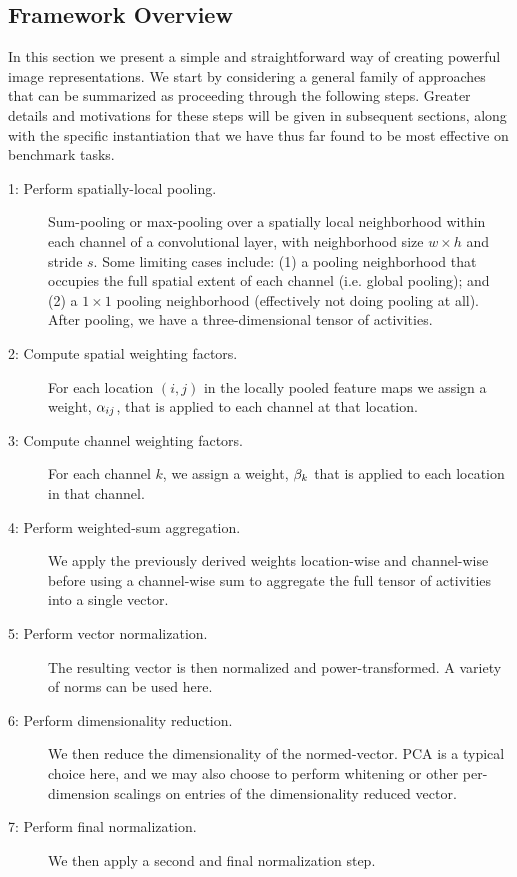 \documentclass[runningheads]{llncs}
\begin{document}
\subsection{Framework Overview}

In this section we present a simple and straightforward way of creating powerful image representations.
We start by considering a general family of approaches that can be summarized as proceeding through the following steps. Greater details and motivations for these steps will be given in subsequent sections, along with the specific instantiation that we have thus far found to be most effective on benchmark tasks. 






\begin{description}
  \item[1: Perform spatially-local pooling.]
	Sum-pooling or max-pooling over a spatially local neighborhood within each channel of a convolutional layer, with neighborhood size $w{\times}h$ and stride $s$. Some limiting cases include: (1) a pooling neighborhood that occupies the full spatial extent of each channel (i.e. global pooling); and (2) a $1{\times}1$ pooling neighborhood (effectively not doing pooling at all). After pooling, we have a three-dimensional tensor of activities.
\item[2: Compute spatial weighting factors.]
  For each location $(i,j)$ in the locally pooled feature maps we assign a weight, $\alpha_{ij}$, that is applied to each channel at that location.
\item[3: Compute channel weighting factors.]
  For each channel $k$, we assign a weight, $\beta_{k}$ that is applied to each location in that channel.
\item[4: Perform weighted-sum aggregation.]
  We apply the previously derived weights location-wise and channel-wise before using a channel-wise sum to aggregate the full tensor of activities into a single vector.
\item[5: Perform vector normalization.]
 The resulting vector is then normalized and power-transformed. A variety of norms can be used here.
\item[6: Perform dimensionality reduction.]
 We then reduce the dimensionality of the normed-vector. PCA is a typical choice here, and we may also choose to perform whitening or other per-dimension scalings on entries of the dimensionality reduced vector.
\item[7: Perform final normalization.]
 We then apply a second and final normalization step.
\end{description}
\end{document}
